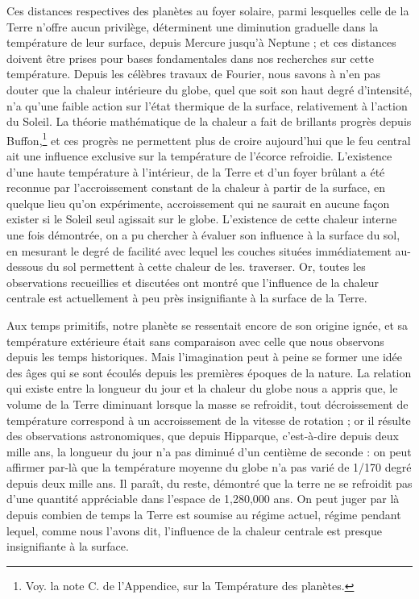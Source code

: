 \documentclass[a4paper, 11pt, oneside]{article}
\begin{document}
Ces distances respectives des planètes au foyer solaire, parmi lesquelles celle de la Terre n'offre aucun privilège, déterminent une diminution graduelle dans la température de leur surface, depuis Mercure jusqu'à Neptune ; et ces distances doivent être prises pour bases fondamentales dans nos recherches sur cette température. Depuis les célèbres travaux de Fourier, nous savons à n'en pas douter que la chaleur intérieure du globe, quel que soit son haut degré d'intensité, n'a qu'une faible action sur l'état thermique de la surface, relativement à l'action du Soleil. La théorie mathématique de la chaleur a fait de brillants progrès depuis Buffon,\footnote{Voy. la note C. de l'Appendice, sur la Température des planètes.} et ces progrès ne permettent plus de croire aujourd'hui que le feu central ait une influence exclusive sur la température de l'écorce refroidie. L'existence d'une haute température à l'intérieur, de la Terre et d'un foyer brûlant a été reconnue par l'accroissement constant de la chaleur à partir de la surface, en quelque lieu qu'on expérimente, accroissement qui ne saurait en aucune façon exister si le Soleil seul agissait sur le globe. L'existence de cette chaleur interne une fois démontrée, on a pu chercher à évaluer son influence à la surface du sol, en mesurant le degré de facilité avec lequel les couches situées immédiatement au-dessous du sol permettent à cette chaleur de les. traverser. Or, toutes les observations recueillies et discutées ont montré que l'influence de la chaleur centrale est actuellement à peu près insignifiante à la surface de la Terre.

Aux temps primitifs, notre planète se ressentait encore de son origine ignée, et sa température extérieure était sans comparaison avec celle que nous observons depuis les temps historiques. Mais l'imagination peut à peine se former une idée des âges qui se sont écoulés depuis les premières époques de la nature. La relation qui existe entre la longueur du jour et la chaleur du globe nous a appris que, le volume de la Terre diminuant lorsque la masse se refroidit, tout décroissement de température correspond à un accroissement de la vitesse de rotation ; or il résulte des observations astronomiques, que depuis Hipparque, c'est-à-dire depuis deux mille ans, la longueur du jour n'a pas diminué d'un centième de seconde :
on peut affirmer par-là que la température moyenne du globe n'a pas varié de 1/170 degré depuis deux mille ans. Il paraît, du reste, démontré que la terre ne se refroidit pas d'une quantité appréciable dans l'espace de 1,280,000 ans. On peut juger par là depuis combien de temps la Terre est soumise au régime actuel, régime pendant lequel, comme nous l'avons dit, l'influence de la chaleur centrale est presque insignifiante à la surface.
\end{document}
